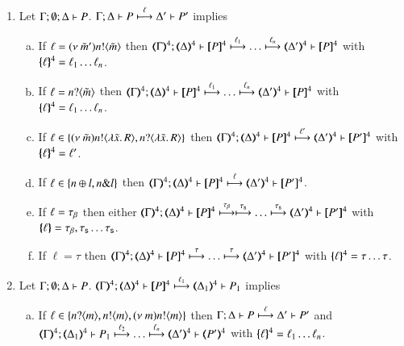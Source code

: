 \begin{proposition}\rm
	\label{prop:op_cor:pHOp_to_HOp}
%
	\begin{enumerate}
		\item	Let $\Gamma; \emptyset; \Delta \vdash P$.
			$\Gamma; \Delta \vdash P \stackrel{\ell}{\longmapsto} \Delta' \vdash P'$ implies
%
			\begin{enumerate}[a)]
				\item	If $\ell = (\nu\ \tilde{m}') n ! \langle \tilde{m} \rangle$ then
					$\horel{\tmap{\Gamma}{4}}{\tmap{\Delta}{4}}{\pmap{P}{4}}{\hby{\ell_1} \dots \hby{\ell_n}}{\tmap{\Delta'}{4}}{\pmap{P}{4}}$
					with $\{\!\!\{\ell\}\!\!\}^{4} = \ell_1 \dots \ell_n$.

				\item	If $\ell = n ? \langle \tilde{m} \rangle$ then
					$\horel{\tmap{\Gamma}{4}}{\tmap{\Delta}{4}}{\pmap{P}{4}}{\hby{\ell_1} \dots \hby{\ell_n}}{\tmap{\Delta'}{4}}{\pmap{P}{4}}$
					with $\{\!\!\{\ell\}\!\!\}^{4} = \ell_1 \dots \ell_n$.

				\item	If $\ell \in \{(\nu\ \tilde{m}) n ! \langle \lambda \tilde{x}.\,R \rangle, n ? \langle \lambda \tilde{x}.\,R \rangle\}$ then
					$\horel{\tmap{\Gamma}{4}}{\tmap{\Delta}{4}}{\pmap{P}{4}}{\hby{\ell'}}
					{\tmap{\Delta'}{4}}{\pmap{P'}{4}}$ with $\{\!\!\{\ell\}\!\!\}^{4} = \ell'$.

				\item	If $\ell \in \{n \oplus l, n \& l\}$ then
					$\horel{\tmap{\Gamma}{4}}{\tmap{\Delta}{4}}{\pmap{P}{4}}{\hby{\ell}}
					{\tmap{\Delta'}{4}}{\pmap{P'}{4}}$.

				\item	If $\ell = \tau_{\beta}$ then either
					$\horel{\tmap{\Gamma}{4}}{\tmap{\Delta}{4}}{\pmap{P}{4}}{\hby{\btau} \hby{\stau} \dots \hby{\stau}}
					{\tmap{\Delta'}{4}}{\pmap{P'}{4}}$ with $\{\!\!\{\ell\}\!\!\} = \tau_{\beta}, \tau_{\mathsf{s}} \dots \tau_{\mathsf{s}}$.

				\item	If $\ell = \tau$ then %
					$\horel{\tmap{\Gamma}{4}}{\tmap{\Delta}{4}}{\pmap{P}{4}}{\hby{\tau} \dots \hby{\tau}}
					{\tmap{\Delta'}{4}}{\pmap{P'}{4}}$ with $\{\!\!\{\ell\}\!\!\}^{4} = \tau \dots \tau$.
			\end{enumerate}

		\item	Let $\Gamma; \emptyset; \Delta \vdash P$.
			$\horel{\tmap{\Gamma}{4}}{\tmap{\Delta}{4}}{\pmap{P}{4}}{\hby{\ell_1}}
			{\tmap{\Delta_1}{4}}{P_1}$ implies
%
			\begin{enumerate}[a)]
				\item	If $\ell \in \{n ? \langle m \rangle, n ! \langle m \rangle, (\nu\ m) n ! \langle m \rangle\}$ then
					$\Gamma; \Delta \vdash P \stackrel{\ell}{\longmapsto} \Delta' \vdash P'$ and\\
					$\horel{\tmap{\Gamma}{4}}{\tmap{\Delta_1}{4}}{P_1}{\hby{\ell_2} \dots \hby{\ell_n}}
					{\tmap{\Delta'}{4}}{\tmap{P'}{4}}$ with $\{\!\!\{\ell\}\!\!\}^{4} = \ell_1 \dots \ell_n$.


\end{enumerate}
\end{enumerate}
\end{proposition}
